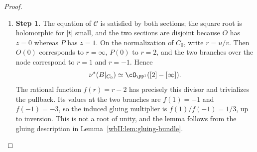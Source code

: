 \begin{proof}
\begin{enumerate}[label={$\langle1\rangle$\arabic*.},leftmargin=*]
\item 
\noindent\textbf{Step 1.} The equation of $\mathcal C$ is satisfied by both sections; the square root
is holomorphic for $|t|$ small, and the two sections are disjoint because
$O$ has $z=0$ whereas $P$ has $z=1$.  On the normalization of $C_0$, write
$r=u/v$.  Then $O(0)$ corresponds to $r=\infty$, $P(0)$ to $r=2$, and the
two branches over the node correspond to $r=1$ and $r=-1$.  Hence
\[
 \nu^*(B|_{C_0})\simeq\cO_{\PP^1}([2]-[\infty]).
\]
The rational function $f(r)=r-2$ has precisely this divisor and trivializes
the pullback.  Its values at the two branches are $f(1)=-1$ and
$f(-1)=-3$, so the induced gluing multiplier is $f(1)/f(-1)=1/3$,
up to inversion.  This is not a root of unity, and the lemma follows from
the gluing description in Lemma~\ref{wbII:lem:gluing-bundle}.

\end{enumerate}
\end{proof}

